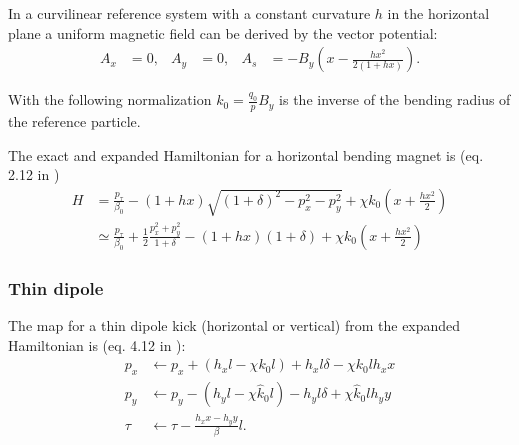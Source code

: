 In a curvilinear reference system with a constant curvature $h$ in the
horizontal plane a uniform magnetic field can be derived by the vector potential:
\begin{align}
  A_x & = 0, & A_y & = 0, & A_s & = 
  - B_y \left(x-\frac{h x^2}{2 (1+h x)}\right).
\end{align}

With the following normalization $k_0=\frac{q_0}{p} B_y$ is the inverse of the bending 
radius of the reference particle.

The exact and expanded Hamiltonian for a horizontal bending magnet is (eq. 2.12 in
\cite{barber87})
\begin{align}
  H &= \frac{p_\tau}{\beta_0} 
       - (1+h x)\sqrt{(1+\delta)^2 -p_x^2 - p_y^2}
       + \chi k_0 \left( x + \frac{h x^2}{2} \right)  \\
    &\simeq   \frac{p_\tau}{\beta_0}
    + \frac{1}{2}\frac{p_x^2+p_y^2}{1+\delta}
  - (1+h x) (1+\delta) + \chi k_0 \left( x + \frac{h x^2}{2} \right)
\end{align}


\subsubsection{Thin dipole}
The map for a thin dipole kick (horizontal or vertical) from the expanded Hamiltonian is 
(eq. 4.12 in \cite{heinemann95}):
\begin{align}
  p_x &\leftarrow p_x + (h_x l - \chi k_0 l)  + h_x l \delta - \chi k_0 l h_x x \\
  p_y &\leftarrow p_y - (h_y l - \chi \hat k_0 l) - h_y l \delta + \chi \hat k_0 l h_y y\\
  \tau &\leftarrow \tau - \frac{h_xx - h_yy}{\beta}  l.
\end{align}



%

